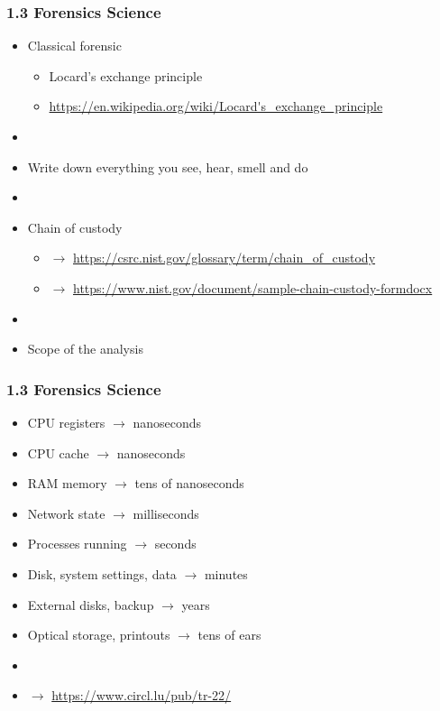 \begin{frame}
  \frametitle{1.3 Forensics Science}
  \begin{itemize}
    \item Classical forensic
    \begin{itemize}
      \item[] Locard's exchange principle
      \item[] {\scriptsize \url{https://en.wikipedia.org/wiki/Locard's\_exchange\_principle}}
    \end{itemize}
    \item[]
    \item Write down everything you see, hear, smell and do
    \item[]
    \item Chain of custody
    \begin{itemize}
        \item[] $\to$ {\scriptsize \url{https://csrc.nist.gov/glossary/term/chain\_of\_custody}}
        \item[] $\to$ {\scriptsize \url{https://www.nist.gov/document/sample-chain-custody-formdocx}}
    \end{itemize}
    \item[]
    \item Scope of the analysis
  \end{itemize}
\end{frame}


\begin{frame}
  \frametitle{1.3 Forensics Science}
  \begin{itemize}
      \item[] CPU registers $\to$ nanoseconds
      \item[] CPU cache $\to$ nanoseconds
      \item[] RAM memory $\to$ tens of nanoseconds
      \item[] Network state $\to$ milliseconds
      \item[] Processes running $\to$ seconds
      \item[] Disk, system settings, data $\to$ minutes
      \item[] External disks, backup $\to$ years
      \item[] Optical storage, printouts $\to$ tens of ears
      \item[] 
      \item[] $\to$ \url{https://www.circl.lu/pub/tr-22/}
  \end{itemize}
\end{frame}


